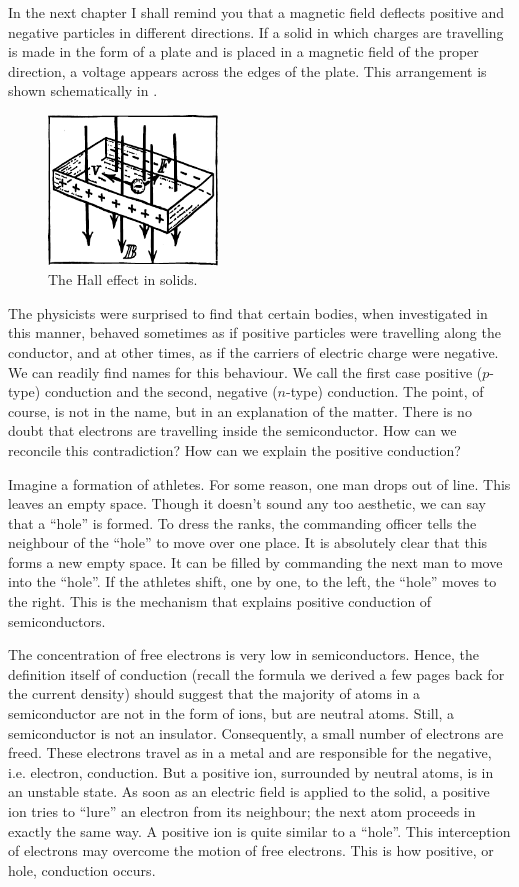 In the next chapter I shall remind you that a magnetic field deflects positive and negative particles in different directions. If a solid in which charges are travelling is made in the form of a plate and is placed in a magnetic field of the proper direction, a voltage appears across the edges of the plate. This arrangement is shown schematically in .
\begin{figure}[!ht]
\centering
\includegraphics[width=0.4\textwidth]{figures/fig-02-08.pdf}
\caption{The Hall effect in solids.}
\label{fig-2.8}
\end{figure}

The physicists were surprised to find that certain bodies, when investigated in this manner, behaved sometimes as if positive particles were travelling along the conductor, and at other times, as if the carriers of electric charge were negative. We can readily find names for this behaviour. We call the first case positive ($p$-type) conduction and the second, negative ($n$-type) conduction. The point, of course, is not in the name, but in an explanation of the matter. There is no doubt that electrons are travelling inside the semiconductor. How can we reconcile this contradiction? How can we explain the positive conduction?

Imagine a formation of athletes. For some reason, one man drops out of line. This leaves an empty space. Though it doesn't sound any too aesthetic, we can say that a
``hole'' is formed. To dress the ranks, the commanding officer tells the neighbour of the ``hole'' to move over one place. It is absolutely clear that this forms a new empty space. It can be filled by commanding the next man to move into the ``hole''. If the athletes shift, one by one, to the left, the ``hole'' moves to the right. This is the mechanism that explains positive conduction of semiconductors.

The concentration of free electrons is very low in semiconductors. Hence, the definition itself of conduction (recall the formula we derived a few pages back for the current density) should suggest that the majority of atoms in a semiconductor are not in the form of ions, but are neutral atoms. Still, a semiconductor is not an insulator. Consequently, a small number of electrons are freed. These electrons travel as in a metal and are responsible for the negative, i.e. electron, conduction. But a positive ion, surrounded by neutral atoms, is in an unstable state. As soon as an electric field is applied to the solid, a positive ion tries to ``lure'' an electron from its neighbour; the next atom proceeds in exactly the same way. A positive ion is quite similar to a ``hole''. This interception of electrons may overcome the motion of free electrons. This is how positive, or hole, conduction occurs.

